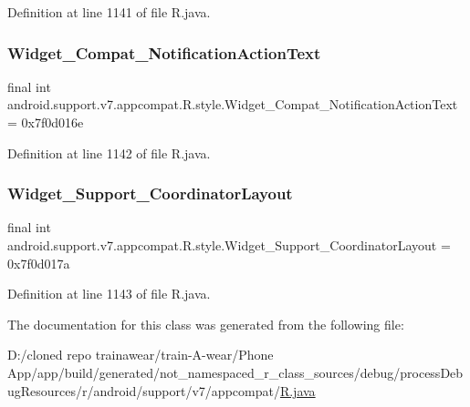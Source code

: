 Definition at line 1141 of file R.\+java.

\mbox{\label{classandroid_1_1support_1_1v7_1_1appcompat_1_1_r_1_1style_a18e9124d71139940e68076f3be26805b}} 
\subsubsection{\texorpdfstring{Widget\_Compat\_NotificationActionText}{Widget\_Compat\_NotificationActionText}}
{\footnotesize\ttfamily final int android.\+support.\+v7.\+appcompat.\+R.\+style.\+Widget\+\_\+\+Compat\+\_\+\+Notification\+Action\+Text = 0x7f0d016e\hspace{0.3cm}{\ttfamily [static]}}



Definition at line 1142 of file R.\+java.

\mbox{\label{classandroid_1_1support_1_1v7_1_1appcompat_1_1_r_1_1style_a423ec154d1ddfd6adbe6d0971ad080e3}} 
\subsubsection{\texorpdfstring{Widget\_Support\_CoordinatorLayout}{Widget\_Support\_CoordinatorLayout}}
{\footnotesize\ttfamily final int android.\+support.\+v7.\+appcompat.\+R.\+style.\+Widget\+\_\+\+Support\+\_\+\+Coordinator\+Layout = 0x7f0d017a\hspace{0.3cm}{\ttfamily [static]}}



Definition at line 1143 of file R.\+java.



The documentation for this class was generated from the following file\+:\begin{DoxyCompactItemize}
\item 
D\+:/cloned repo trainawear/train-\/\+A-\/wear/\+Phone App/app/build/generated/not\+\_\+namespaced\+\_\+r\+\_\+class\+\_\+sources/debug/process\+Debug\+Resources/r/android/support/v7/appcompat/\mbox{\hyperlink{process_debug_resources_2r_2android_2support_2v7_2appcompat_2_r_8java}{R.\+java}}\end{DoxyCompactItemize}
